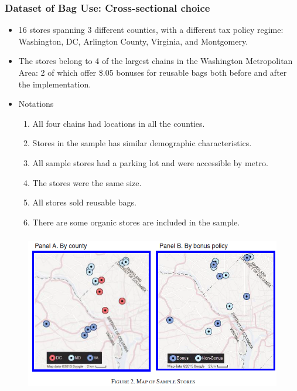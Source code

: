 \documentclass[dvipdfmx,11pt]{beamer}
\begin{document}
\begin{frame}\frametitle{Dataset of Bag Use: Cross-sectional choice}
  \begin{itemize}
    \item 16 stores spanning 3 different counties, with a different tax policy regime: Washington, DC, Arlington County, Virginia, and Montgomery.
    \item The stores belong to 4 of the largest chains in the Washington Metropolitan Area: 2 of which offer \$.05 bonuses for reusable bags both before and after the implementation.
    \item Notations
    \begin{enumerate}
      \item All four chains had locations in all the counties.
      \item Stores in the sample has similar demographic characteristics.
      \item All sample stores had a parking lot and were accessible by metro.
      \item The stores were the same size.
      \item All stores sold reusable bags.
      \item There are some organic stores are included in the sample.
    \end{enumerate}
  \end{itemize}
\end{frame}

\begin{frame}\frametitle{}
  \begin{figure}[ht]
    \centering
    \includegraphics[scale = .8]{0807tanji/F2}
  \end{figure}
\end{frame}
\end{document}
